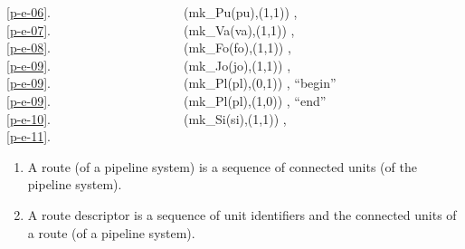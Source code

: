 \ref{p-e-06}.\ \ \ \ \ \ \ \ \ \ \ \ \ \ \ \ \ \ \ \ \ (mk\_Pu(pu),(1,1)) {\RIGHTARROW} ,\\
\ref{p-e-07}.\ \ \ \ \ \ \ \ \ \ \ \ \ \ \ \ \ \ \ \ \ (mk\_Va(va),(1,1)) {\RIGHTARROW} ,\\
\ref{p-e-08}.\ \ \ \ \ \ \ \ \ \ \ \ \ \ \ \ \ \ \ \ \ (mk\_Fo(fo),(1,1)) {\RIGHTARROW} ,\\
\ref{p-e-09}.\ \ \ \ \ \ \ \ \ \ \ \ \ \ \ \ \ \ \ \ \ (mk\_Jo(jo),(1,1)) {\RIGHTARROW} ,\\
\ref{p-e-09}.\ \ \ \ \ \ \ \ \ \ \ \ \ \ \ \ \ \ \ \ \ (mk\_Pl(pl),(0,1)) {\RIGHTARROW} , ``begin''\\
\ref{p-e-09}.\ \ \ \ \ \ \ \ \ \ \ \ \ \ \ \ \ \ \ \ \ (mk\_Pl(pl),(1,0)) {\RIGHTARROW} , ``end''\\
\ref{p-e-10}.\ \ \ \ \ \ \ \ \ \ \ \ \ \ \ \ \ \ \ \ \ (mk\_Si(si),(1,1)) {\RIGHTARROW} ,\\
\ref{p-e-11}.\ \ \ \ \ \ \ \ \ \ \ \ \ \ \ \ \ \ \ \ \ {\UNDERLINE} {\RIGHTARROW}   
\ep


\label{primer-pipe}\HHHH

\begin{enumerate}\setei
\item \label{p-e-12} A route (of a pipeline system) is a sequence of
                     connected units (of the pipeline system). 
\item \label{p-e-13} A route descriptor is a sequence of unit
                     identifiers and the connected units of a route
                     (of a pipeline system).
\savei\end{enumerate}


